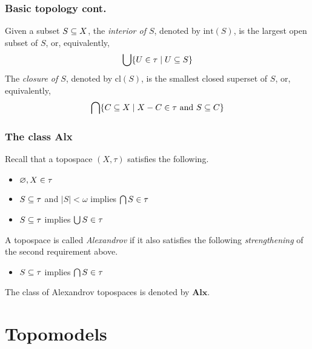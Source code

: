\documentclass[
	11pt, %
	aspectratio=1610, %
]{beamer}
\begin{document}

\begin{frame}
	\frametitle{Basic topology cont.}

	Given a subset $S \subseteq X$, the \emph{interior of $S$}, denoted by $\text{int}(S)$, is the largest open subset of $S$, or, equivalently,
		\[ \bigcup \{ U \in \tau \mid U \subseteq S \} \]
	The \emph{closure of $S$}, denoted by $\text{cl}(S)$, is the smallest closed superset of $S$, or, equivalently,
		\[ \bigcap \{ C \subseteq X \mid  X-C \in \tau \text{ and } S \subseteq C \} \]

\end{frame}


\begin{frame}
	\frametitle{The class \textbf{Alx}}

	Recall that a topospace $(X, \tau)$ satisfies the following.
	\begin{itemize}
		\item $\varnothing, X \in \tau$
		\item $S \subseteq \tau$ and $|S| < \omega$ implies $\bigcap S \in \tau$
		\item $S \subseteq \tau$ implies $\bigcup S \in \tau$
	\end{itemize}

	\bigskip

	A topospace is called \emph{Alexandrov} if it also satisfies the following \emph{strengthening} of the second requirement above.
	\begin{itemize}
		\item $S \subseteq \tau$  implies $\bigcap S \in \tau$
	\end{itemize}

	\bigskip

	The class of Alexandrov topospaces is denoted by $\mathbf{Alx}$.

\end{frame}


\section{Topomodels}

\end{document}
